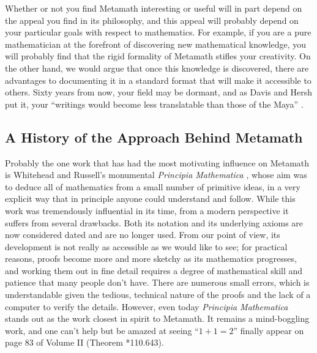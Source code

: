 Whether or not you find Metamath interesting or useful will in part depend on
the appeal you find in its philosophy, and this appeal will probably depend on
your particular goals with respect to mathematics.  For example, if you are a
pure mathematician at the forefront of discovering new mathematical knowledge,
you will probably find that the rigid formality of Metamath stifles your
creativity.  On the other hand, we would argue that once this knowledge is
discovered, there are advantages to documenting it in a standard format that
will make it accessible to others.  Sixty years from now, your field may be
dormant, and as Davis and Hersh put it, your ``writings would become less
translatable than those of the Maya'' \cite[p.~37]{Davis}.


\subsection{A History of the Approach Behind Metamath}

Probably the one work that has had the most motivating influence on
Metamath is Whitehead and Russell's monumental {\em Principia
Mathematica} \cite{PM}, whose aim
was to deduce all of mathematics from a small number of primitive ideas, in a
very explicit way that in principle anyone could understand and follow.  While
this work was tremendously influential in its time, from a modern perspective
it suffers from several drawbacks.  Both its notation and its underlying
axioms are now considered dated and are no longer used.  From our point of
view, its development is not really as accessible as we would like to see; for
practical reasons, proofs become more and more sketchy as its mathematics
progresses, and working them out in fine detail requires a degree of
mathematical skill and patience that many people don't have.  There are
numerous small errors, which is understandable given the tedious, technical
nature of the proofs and the lack of a computer to verify the details.
However, even today {\em Principia Mathematica} stands out as the work closest
in spirit to Metamath.  It remains a mind-boggling work, and one can't help
but be amazed at seeing ``$1+1=2$'' finally appear on page 83 of Volume II
(Theorem *110.643).

